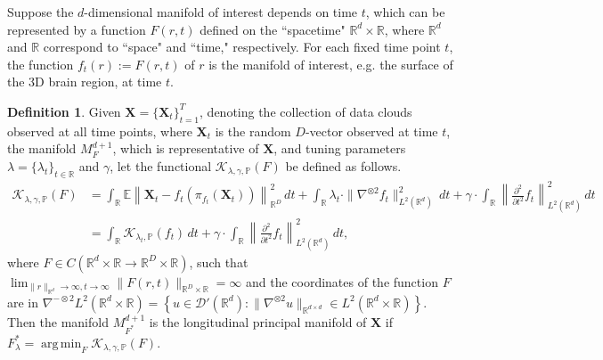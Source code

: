 \documentclass[11pt,reqno]{article}
\DeclareMathOperator*{\argmin}{arg\,min}
\theoremstyle{definition}
\newtheorem{definition}{Definition}
\begin{document}
Suppose the $d$-dimensional manifold of interest depends on time $t$, which can be represented by a function $F(r,t)$ defined on the ``spacetime" $\mathbb{R}^d\times\mathbb{R}$, where $\mathbb{R}^d$ and $\mathbb{R}$ correspond to ``space" and ``time," respectively. For each fixed time point $t$, the function $f_t(r):=F(r,t)$ of $r$ is the manifold of interest, e.g. the surface of the 3D brain region, at time $t$.
\begin{definition}
  \label{def:lpme} Given $\mathbf{X} = \{ \mathbf{X}_t \}_{t=1}^T$, denoting the collection of data clouds observed at all time points, where $\mathbf{X}_t$ is the random  $D$-vector observed at time $t$, the manifold $M_F^{d+1}$, which is representative of $\mathbf{X}$, and tuning parameters $\lambda=\{\lambda_t\}_{t\in\mathbb{R}}$ and $\gamma$, let the functional $\mathcal{K}_{\lambda, \gamma, \mathbb{P}}(F)$ be defined as follows.
\begin{align}\label{eq:newKappa}
  \mathcal{K}_{\lambda, \gamma, \mathbb{P}}(F) &= \int_\mathbb{R} \mathbb{E}\left\|\mathbf{X}_t - f_t\left(\pi_{f_t}(\mathbf{X}_t)\right)\right\|_{\mathbb{R}^{D}}^2 \, dt + \int_\mathbb{R} \lambda_t \cdot\|\nabla^{\otimes 2}f_t\|_{L^2(\mathbb{R}^{d})}^2 \, dt + \gamma\cdot \int_{\mathbb{R}}\left\|\frac{\partial^2}{\partial t^2}f_t\right\|_{L^2(\mathbb{R}^d)}^2 \, dt \\
  &= \int_{\mathbb{R}}\mathcal{K}_{\lambda_t, \mathbb{P}}(f_t) \, dt + \gamma \cdot \int_{\mathbb{R}}\left\|\frac{\partial^2}{\partial t^2}f_t\right\|_{L^2(\mathbb{R}^d)}^2 \, dt, \nonumber
\end{align}
where $F \in C(\mathbb{R}^{d}\times\mathbb{R} \to \mathbb{R}^{D}\times\mathbb{R})$, such that $\lim_{\|r\|_{\mathbb{R}^{d}} \to \infty, t \to \infty}\|F(r,t)\|_{\mathbb{R}^{D}\times\mathbb{R}} = \infty$ and the coordinates of the function $F$ are in $\nabla^{-\otimes 2}L^2(\mathbb{R}^{d}\times\mathbb{R}) = \left\{u \in \mathcal{D}'(\mathbb{R}^{d}): \|\nabla^{\otimes 2} u\|_{\mathbb{R}^{d \times d}} \in L^2(\mathbb{R}^{d}\times\mathbb{R})\right\}$. Then the manifold $M_{F^{*}}^{d+1}$ is the longitudinal principal manifold of $\mathbf{X}$ if $F_{\lambda}^{*} = \argmin_{F}\mathcal{K}_{\lambda, \gamma, \mathbb{P}}(F)$.
\end{definition}
\end{document}
